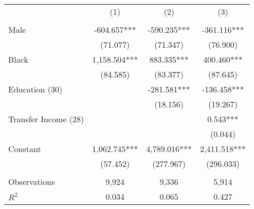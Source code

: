 \begin{tabular}{lccc} \toprule
 & (1) & (2) & (3) \\ \\ \midrule
Male & -604.657*** & -590.235*** & -361.116*** \\
 & (71.077) & (71.347) & (76.900) \\
Black & 1,158.504*** & 883.335*** & 400.460*** \\
 & (84.585) & (83.377) & (87.645) \\
Education (30) &  & -281.581*** & -136.458*** \\
 &  & (18.156) & (19.267) \\
Transfer Income (28) &  &  & 0.543*** \\
 &  &  & (0.044) \\
Constant & 1,062.745*** & 4,789.016*** & 2,411.518*** \\
 & (57.452) & (277.967) & (296.033) \\ \\ \midrule
Observations & 9,924 & 9,336 & 5,914 \\
$R^2$ & 0.034 & 0.065 & 0.427 \\ \bottomrule
\end{tabular}

